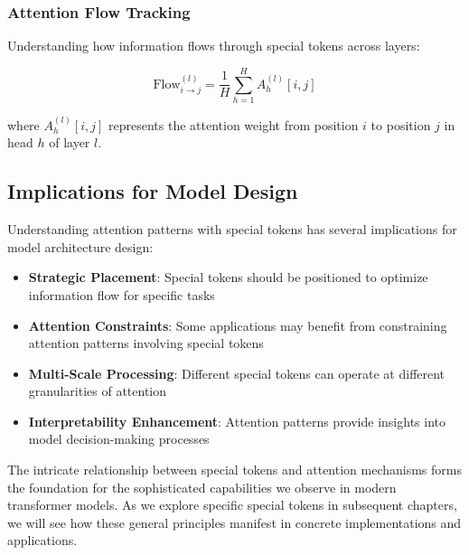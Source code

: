 \subsubsection{Attention Flow Tracking}

Understanding how information flows through special tokens across layers:

\begin{equation}
\text{Flow}_{i \rightarrow j}^{(l)} = \frac{1}{H} \sum_{h=1}^{H} A_h^{(l)}[i,j]
\end{equation}

where $A_h^{(l)}[i,j]$ represents the attention weight from position $i$ to position $j$ in head $h$ of layer $l$.

\subsection{Implications for Model Design}

Understanding attention patterns with special tokens has several implications for model architecture design:

\begin{itemize}
\item \textbf{Strategic Placement}: Special tokens should be positioned to optimize information flow for specific tasks
\item \textbf{Attention Constraints}: Some applications may benefit from constraining attention patterns involving special tokens
\item \textbf{Multi-Scale Processing}: Different special tokens can operate at different granularities of attention
\item \textbf{Interpretability Enhancement}: Attention patterns provide insights into model decision-making processes
\end{itemize}
\begin{comment}
Feedback: This is a good list of implications. To make it more concrete, you could add a brief example for one or two of the points. For "Strategic Placement," you could add: "(e.g., placing a [CLS] token at the beginning of the sequence allows it to build a representation as it sees the full context, whereas placing it at the end might change its aggregation strategy)." For "Attention Constraints," you could mention: "(e.g., forcing certain tokens to only attend to their local context to save computation)."
\end{comment}

The intricate relationship between special tokens and attention mechanisms forms the foundation for the sophisticated capabilities we observe in modern transformer models. As we explore specific special tokens in subsequent chapters, we will see how these general principles manifest in concrete implementations and applications.
